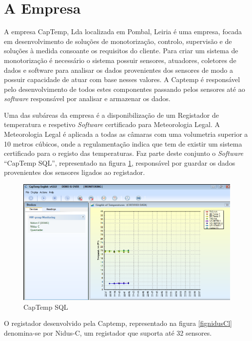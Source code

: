 \section{A Empresa}
\par
A empresa CapTemp, Lda localizada em Pombal, Leiria é uma empresa, focada em desenvolvimento de soluções de monotorização, controlo, supervisão e de soluções à medida consoante os requisitos do cliente. Para criar um sistema de monotorização é necessário o sistema possuir sensores, atuadores, coletores de dados e software para analisar os dados provenientes dos sensores de modo a possuir capacidade de atuar com base nesses valores. A Captemp é responsável pelo desenvolvimento de todos estes componentes passando pelos sensores até ao \textit{software} responsável por analisar e armazenar os dados.\par
Uma das subáreas da empresa é a disponibilização de um Registador de temperatura e respetivo \textit{Software} certificado para Meteorologia Legal. A Meteorologia Legal é aplicada a todas as câmaras com uma volumetria superior a 10 metros cúbicos, onde a regulamentação indica que tem de existir um sistema certificado para o registo das temperaturas.
Faz parte deste conjunto o \textit{Software} “CapTemp SQL”, representado na figura \ref{figcaptempsql}, responsável por guardar os dados provenientes dos sensores ligados ao registador.\par
\begin{figure}[ht]
  \centering
  \includegraphics[width=1.00\textwidth]{images/captemp.png}
  \caption{CapTemp SQL}\label{figcaptempsql}
\end{figure}
O registador desenvolvido pela Captemp, representado na figura \ref{fignidusCl} denomina-se por Nidus-C, um registador que suporta até 32 sensores.\par

